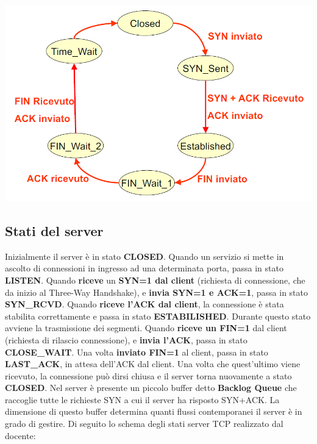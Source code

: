 \documentclass[12pt]{article}
\begin{document}
\begin{center}
    \includegraphics[scale=0.5]{tcp_client_states}
\end{center}

\subsection{Stati del server}

Inizialmente il server è in stato \textbf{CLOSED}. Quando un servizio si mette in ascolto di connessioni in ingresso ad una determinata porta, passa in stato \textbf{LISTEN}. Quando \textbf{riceve} un \textbf{SYN=1 dal client} (richiesta di connessione, che da inizio al Three-Way Handshake), e \textbf{invia SYN=1 e ACK=1}, passa in stato \textbf{SYN\_RCVD}. Quando \textbf{riceve l'ACK dal client}, la connessione è stata stabilita correttamente e passa in stato \textbf{ESTABILISHED}. Durante questo stato avviene la trasmissione dei segmenti. Quando \textbf{riceve un FIN=1} dal client (richiesta di rilascio connessione), e \textbf{invia l'ACK}, passa in stato \textbf{CLOSE\_WAIT}. Una volta \textbf{inviato FIN=1} al client, passa in stato \textbf{LAST\_ACK}, in attesa dell'ACK dal client. Una volta che quest'ultimo viene ricevuto, la connessione può dirsi chiusa e il server torna nuovamente a stato \textbf{CLOSED}. Nel server è presente un piccolo buffer detto \textbf{Backlog Queue} che raccoglie tutte le richieste SYN a cui il server ha risposto SYN+ACK. La dimensione di questo buffer determina quanti flussi contemporanei il server è in grado di gestire. Di seguito lo schema degli stati server TCP realizzato dal docente:
\end{document}
